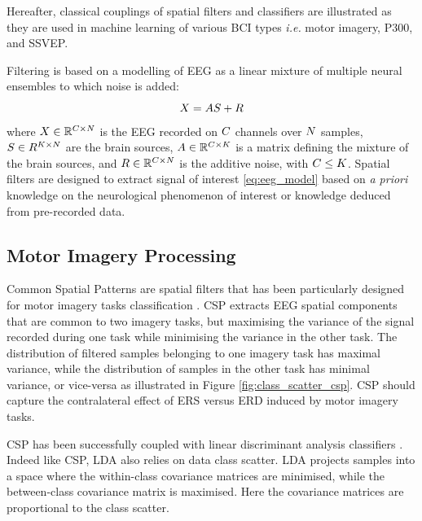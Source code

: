 Hereafter, classical couplings of spatial filters and classifiers are illustrated as they are used in machine learning of various BCI types \textit{i.e.} motor imagery, P300, and SSVEP.   

Filtering is based on a modelling of EEG as a linear mixture of multiple neural ensembles to which noise is added:
\begin{equation}
\X = AS+R
\label{eq:eeg_model}
\end{equation} 
where $X \in \mathbb{R}^{C \times N}$ is the EEG recorded on $C$ channels over $N$ samples, $S \in R^{K \times N}$ are the brain sources, $A \in \mathbb{R}^{C \times K}$ is a matrix defining the mixture of the brain sources, and $R \in \mathbb{R}^{C \times N}$ is the additive noise, with $C \leq K$.  
Spatial filters are designed to extract signal of interest \eqref{eq:eeg_model} based on \textit{a priori} knowledge on the neurological phenomenon of interest or knowledge deduced from pre-recorded data.

%
%
%

\subsection{Motor Imagery Processing} %
\label{subsec:sign_proc_mi}
Common Spatial Patterns are spatial filters that has been particularly designed for motor imagery tasks classification \citep{koles_spatial_1990}. 
CSP extracts EEG spatial components that are common to two imagery tasks, but maximising the variance of the signal recorded during one task while minimising the variance in the other task.
The distribution of filtered samples belonging to one imagery task has maximal variance, while the distribution of samples in the other task has minimal variance, or vice-versa as illustrated in Figure \ref{fig:class_scatter_csp}. 
CSP should capture the contralateral effect of ERS versus ERD induced by motor imagery tasks. 

CSP has been successfully coupled with linear discriminant analysis classifiers \citep{dornhege_increase_2004, popescu_single_2007}. 
Indeed like CSP, LDA also relies on data class scatter. 
LDA projects samples into a space where the within-class covariance matrices are minimised, while the between-class covariance matrix is maximised. Here the covariance matrices are proportional to the class scatter.  

